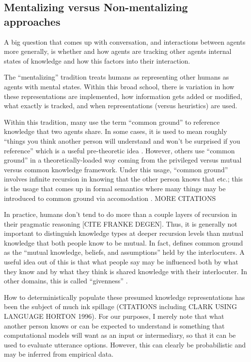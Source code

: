 \documentclass[]{article}
\begin{document}
\subsection{Mentalizing versus Non-mentalizing approaches}

A big question that comes up with conversation, and interactions between agents more generally, is whether and how agents are tracking other agents internal states of knowledge and how this factors into their interaction.

The ``mentalizing'' tradition treats humans as representing other humans as agents with mental states. Within this broad school, there is variation in how these representations are implemented, how information gets added or modified, what exactly is tracked, and when representations (versus heuristics) are used. 

Within this tradition, many use the term ``common ground'' to reference knowledge that two agents share. In some cases, it is used to mean roughly ``things you think another person will understand and won't be surprised if you reference'' which is a useful pre-theoretic idea \cite{leung2023}. However, others use ``common ground'' in a theoretically-loaded way coming from the privileged versus mutual versus common knowledge framework. Under this usage, ``common ground'' involves infinite recursion in knowing that the other person knows that etc.; this is the usage that comes up in formal semantics where many things may be introduced to common ground via accomodation \cite{horton1996}. MORE CITATIONS

In practice, humans don't tend to do more than a couple layers of recursion in their pragmatic reasoning [CITE FRANKE DEGEN]. Thus, it is generally not important to distinguish knowledge types at deeper recursion levels than mutual knowledge that both people know to be mutual. In fact, \cite{hanna2003} defines common ground as the ``mutual knowledge, beliefs, and assumptions'' held by the interlocuters. A useful idea out of this is that what people say may be influenced both by what they know and by what they think is shared knowledge with their interlocuter. In other domains, this is called ``givenness'' \cite{fay2010}.  

How to deterministically populate these presumed knowledge representations has been the subject of much ink spillage (CITATIONS including CLARK USING LANGUAGE HORTON 1996). For our purposes, I merely note that what another person knows or can be expected to understand is something that computational models will want as an input or intermediary, so that it can be used to evaluate utterance options. However, this can clearly be probabilistic and may be inferred from empirical data. 
\end{document}
